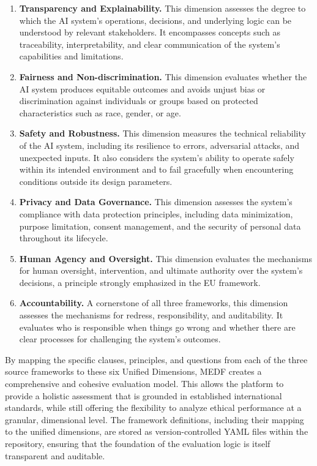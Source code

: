 \begin{enumerate}[leftmargin=2em]
  \item \textbf{Transparency and Explainability.} This dimension assesses the degree to which the AI system's operations, decisions, and underlying logic can be understood by relevant stakeholders. It encompasses concepts such as traceability, interpretability, and clear communication of the system's capabilities and limitations.

  \item \textbf{Fairness and Non-discrimination.} This dimension evaluates whether the AI system produces equitable outcomes and avoids unjust bias or discrimination against individuals or groups based on protected characteristics such as race, gender, or age.

  \item \textbf{Safety and Robustness.} This dimension measures the technical reliability of the AI system, including its resilience to errors, adversarial attacks, and unexpected inputs. It also considers the system's ability to operate safely within its intended environment and to fail gracefully when encountering conditions outside its design parameters.

  \item \textbf{Privacy and Data Governance.} This dimension assesses the system's compliance with data protection principles, including data minimization, purpose limitation, consent management, and the security of personal data throughout its lifecycle.

  \item \textbf{Human Agency and Oversight.} This dimension evaluates the mechanisms for human oversight, intervention, and ultimate authority over the system's decisions, a principle strongly emphasized in the EU framework.

  \item \textbf{Accountability.} A cornerstone of all three frameworks, this dimension assesses the mechanisms for redress, responsibility, and auditability. It evaluates who is responsible when things go wrong and whether there are clear processes for challenging the system's outcomes.
\end{enumerate}

By mapping the specific clauses, principles, and questions from each of the three source frameworks to these six Unified Dimensions, MEDF creates a comprehensive and cohesive evaluation model. This allows the platform to provide a holistic assessment that is grounded in established international standards, while still offering the flexibility to analyze ethical performance at a granular, dimensional level. The framework definitions, including their mapping to the unified dimensions, are stored as version-controlled YAML files within the repository, ensuring that the foundation of the evaluation logic is itself transparent and auditable.
